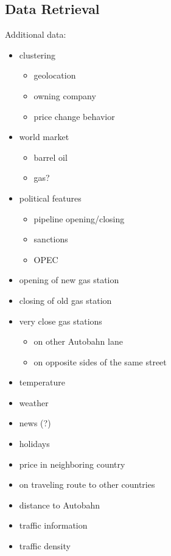 \documentclass[%
a4paper,
DIV12,
2.5headlines,
bigheadings,
titlepage,
openbib,
]{scrartcl}
\begin{document}
\subsection{Data Retrieval}\label{data-retrieval}
Additional data:
\begin{itemize}
\item clustering

\begin{itemize}
\item geolocation
\item owning company
\item price change behavior
\end{itemize}

\item world market

\begin{itemize}
\item barrel oil
\item gas?
\end{itemize}

\item political features

\begin{itemize}
\item pipeline opening/closing
\item sanctions
\item OPEC
\end{itemize}

\item opening of new gas station
\item closing of old gas station
\item very close gas stations
 
\begin{itemize}
\item on other Autobahn lane
\item on opposite sides of the same street
\end{itemize}

\item temperature
\item weather
\item news (?)
\item holidays
\item price in neighboring country
\item on traveling route to other countries
\item distance to Autobahn
\item traffic information
\item traffic density
\end{itemize}
 
\end{document}

